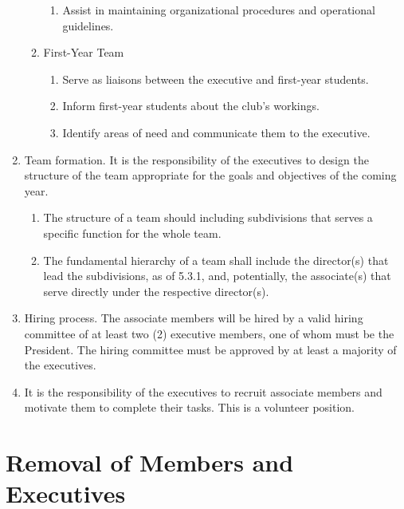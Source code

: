 \documentclass[12pt,a4paper]{article}
\begin{document}
\begin{enumerate}
\begin{enumerate}
\begin{enumerate}
\item Assist in maintaining organizational procedures and operational guidelines.
\end{enumerate}

\item First-Year Team

\begin{enumerate}
\item Serve as liaisons between the executive and first-year students.

\item Inform first-year students about the club's workings.

\item Identify areas of need and communicate them to the executive.
\end{enumerate}
\end{enumerate}

\item Team formation. It is the responsibility of the executives to design the structure of the team appropriate for the goals and objectives of the coming year.

\begin{enumerate}
\item The structure of a team should including subdivisions that serves a specific function for the whole team.

\item The fundamental hierarchy of a team shall include the director(s) that lead the subdivisions, as of 5.3.1, and, potentially, the associate(s) that serve directly under the respective director(s).
\end{enumerate}

\item Hiring process. The associate members will be hired by a valid hiring committee of at least two (2) executive members, one of whom must be the President. The hiring committee must be approved by at least a majority of the executives.

\item It is the responsibility of the executives to recruit associate members and motivate them to complete their tasks. This is a volunteer position.
\end{enumerate}

\section{Removal of Members and Executives}
\end{document}
